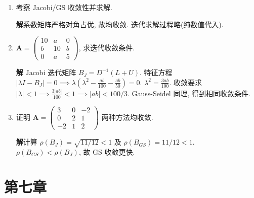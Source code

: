 \documentclass[a4paper,11pt]{ctexart}
\newcommand{\sol}{\par\noindent\textbf{解}\quad}
\begin{document}
\begin{enumerate}[label=\textbf{6-\arabic*.}, leftmargin=*]
    \item 考察 Jacobi/GS 收敛性并求解.
    \sol 系数矩阵严格对角占优, 故均收敛.
    迭代求解过程略(纯数值代入).

    \item[4.] $\bm{A} = \begin{pmatrix} 10 & a & 0 \\ b & 10 & b \\ 0 & a & 5 \end{pmatrix}$, 求迭代收敛条件.
    
    \sol
    Jacobi 迭代矩阵 $B_J = D^{-1}(L+U)$.
    特征方程 $|\lambda I - B_J| = 0 \implies \lambda(\lambda^2 - \frac{ab}{100} - \frac{ab}{50}) = 0$.
    $\lambda^2 = \frac{3ab}{100}$. 收敛要求 $|\lambda| < 1 \implies \frac{3|ab|}{100} < 1 \implies |ab| < 100/3$.
    Gauss-Seidel 同理, 得到相同收敛条件.

    \item[6.] 证明 $\bm{A} = \begin{pmatrix} 3 & 0 & -2 \\ 0 & 2 & 1 \\ -2 & 1 & 2 \end{pmatrix}$ 两种方法均收敛.
    \sol 计算 $\rho(B_J) = \sqrt{11/12} < 1$ 及 $\rho(B_{GS}) = 11/12 < 1$.
    $\rho(B_{GS}) < \rho(B_J)$, 故 GS 收敛更快.
\end{enumerate}

\section*{第七章}
\end{document}
